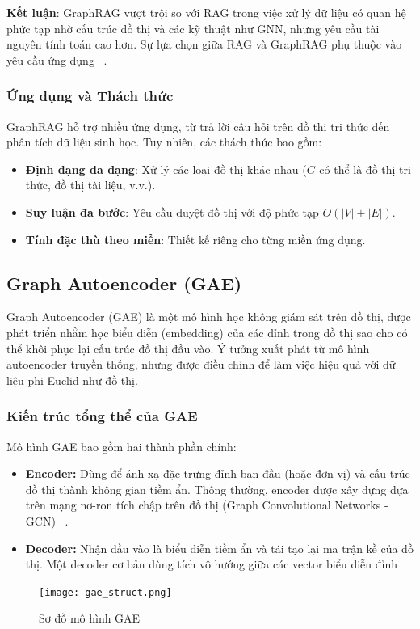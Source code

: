 \documentclass[a4paper]{article}
\begin{document}
\textbf{Kết luận}: GraphRAG vượt trội so với RAG trong việc xử lý dữ liệu có quan hệ phức tạp nhờ cấu trúc đồ thị và các kỹ thuật như GNN, nhưng yêu cầu tài nguyên tính toán cao hơn. Sự lựa chọn giữa RAG và GraphRAG phụ thuộc vào yêu cầu ứng dụng ~\cite{Chen2024GraphRAG}.
\subsubsection{Ứng dụng và Thách thức}
GraphRAG hỗ trợ nhiều ứng dụng, từ trả lời câu hỏi trên đồ thị tri thức đến phân tích dữ liệu sinh học. Tuy nhiên, các thách thức bao gồm:
\begin{itemize}
    \item \textbf{Định dạng đa dạng}: Xử lý các loại đồ thị khác nhau ($G$ có thể là đồ thị tri thức, đồ thị tài liệu, v.v.).
    \item \textbf{Suy luận đa bước}: Yêu cầu duyệt đồ thị với độ phức tạp $O(|V| + |E|)$.
    \item \textbf{Tính đặc thù theo miền}: Thiết kế riêng cho từng miền ứng dụng.
\end{itemize}

\subsection{Graph Autoencoder (GAE)}

Graph Autoencoder (GAE) là một mô hình học không giám sát trên đồ thị, được phát triển nhằm học biểu diễn (embedding) của các đỉnh trong đồ thị sao cho có thể khôi phục lại cấu trúc đồ thị đầu vào. Ý tưởng xuất phát từ mô hình autoencoder truyền thống, nhưng được điều chỉnh để làm việc hiệu quả với dữ liệu phi Euclid như đồ thị.

\subsubsection{Kiến trúc tổng thể của GAE}

Mô hình GAE bao gồm hai thành phần chính:

\begin{itemize}
  \item \textbf{Encoder:} Dùng để ánh xạ đặc trưng đỉnh ban đầu (hoặc đơn vị) và cấu trúc đồ thị thành không gian tiềm ẩn. Thông thường, encoder được xây dựng dựa trên mạng nơ-ron tích chập trên đồ thị (Graph Convolutional Networks - GCN) ~\cite{kipf2016semi}.
  \item \textbf{Decoder:} Nhận đầu vào là biểu diễn tiềm ẩn và tái tạo lại ma trận kề của đồ thị. Một decoder cơ bản dùng tích vô hướng giữa các vector biểu diễn đỉnh
  
\end{itemize}
\begin{figure}[H]
    \centering
    \texttt{[image: gae\_struct.png]}
    \caption{Sơ đồ mô hình GAE }
\end{figure}
\end{document}
